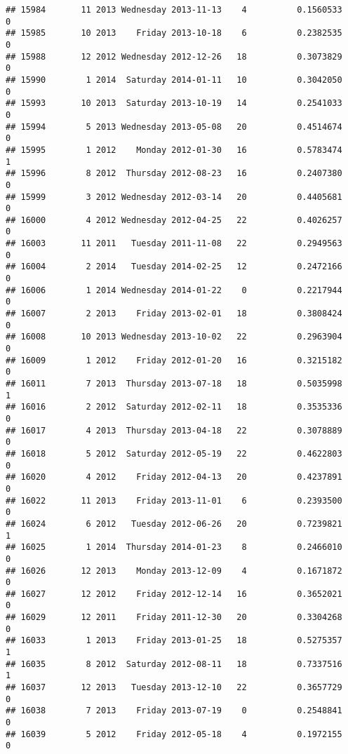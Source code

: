 \documentclass[
]{article}
\begin{document}
\begin{verbatim}
## 15984       11 2013 Wednesday 2013-11-13    4          0.1560533             0
## 15985       10 2013    Friday 2013-10-18    6          0.2382535             0
## 15988       12 2012 Wednesday 2012-12-26   18          0.3073829             0
## 15990        1 2014  Saturday 2014-01-11   10          0.3042050             0
## 15993       10 2013  Saturday 2013-10-19   14          0.2541033             0
## 15994        5 2013 Wednesday 2013-05-08   20          0.4514674             0
## 15995        1 2012    Monday 2012-01-30   16          0.5783474             1
## 15996        8 2012  Thursday 2012-08-23   16          0.2407380             0
## 15999        3 2012 Wednesday 2012-03-14   20          0.4405681             0
## 16000        4 2012 Wednesday 2012-04-25   22          0.4026257             0
## 16003       11 2011   Tuesday 2011-11-08   22          0.2949563             0
## 16004        2 2014   Tuesday 2014-02-25   12          0.2472166             0
## 16006        1 2014 Wednesday 2014-01-22    0          0.2217944             0
## 16007        2 2013    Friday 2013-02-01   18          0.3808424             0
## 16008       10 2013 Wednesday 2013-10-02   22          0.2963904             0
## 16009        1 2012    Friday 2012-01-20   16          0.3215182             0
## 16011        7 2013  Thursday 2013-07-18   18          0.5035998             1
## 16016        2 2012  Saturday 2012-02-11   18          0.3535336             0
## 16017        4 2013  Thursday 2013-04-18   22          0.3078889             0
## 16018        5 2012  Saturday 2012-05-19   22          0.4622803             0
## 16020        4 2012    Friday 2012-04-13   20          0.4237891             0
## 16022       11 2013    Friday 2013-11-01    6          0.2393500             0
## 16024        6 2012   Tuesday 2012-06-26   20          0.7239821             1
## 16025        1 2014  Thursday 2014-01-23    8          0.2466010             0
## 16026       12 2013    Monday 2013-12-09    4          0.1671872             0
## 16027       12 2012    Friday 2012-12-14   16          0.3652021             0
## 16029       12 2011    Friday 2011-12-30   20          0.3304268             0
## 16033        1 2013    Friday 2013-01-25   18          0.5275357             1
## 16035        8 2012  Saturday 2012-08-11   18          0.7337516             1
## 16037       12 2013   Tuesday 2013-12-10   22          0.3657729             0
## 16038        7 2013    Friday 2013-07-19    0          0.2548841             0
## 16039        5 2012    Friday 2012-05-18    4          0.1972155             0

\end{verbatim}
\end{document}
